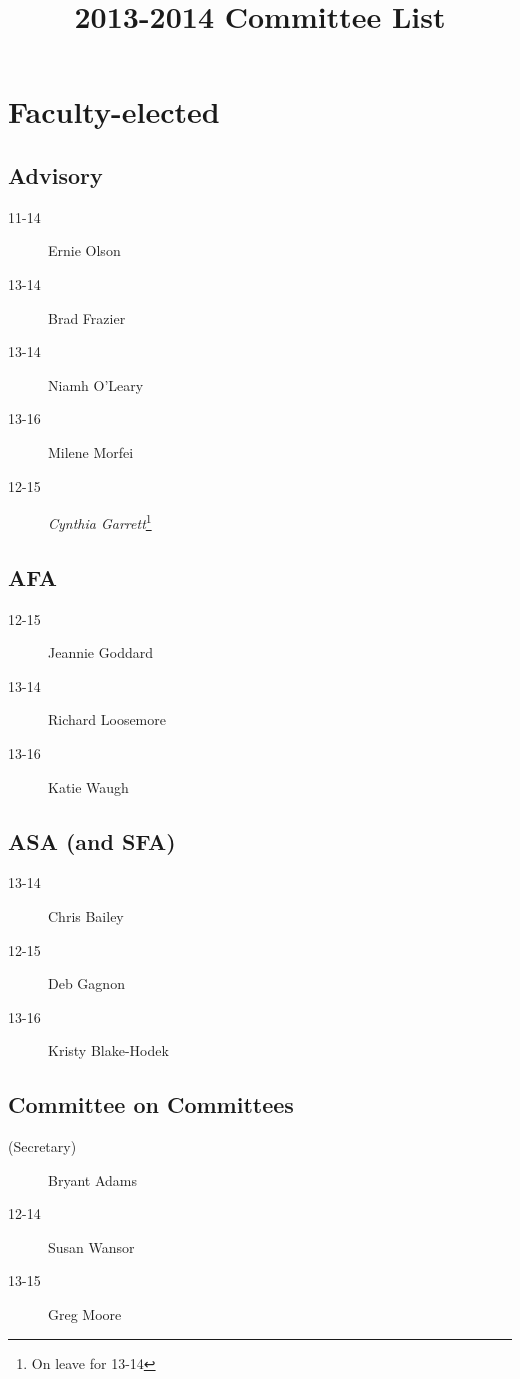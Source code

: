 \documentclass[10pt, twocolumn]{amsart}
\title{2013-2014 Committee List}
\newcommand{\noteMajor}[1]{}
\newcommand{\tempAbsent}[2]{\textit{#1}\footnote{On leave for #2}}
\begin{document}
\maketitle

\section*{Faculty-elected}
\subsection*{Advisory}
\begin{description}
\item[11-14] Ernie Olson \noteMajor{Anthropology and Religion}
\item[13-14] Brad Frazier \noteMajor{Philosophy and Religion}
\item[13-14] Niamh O'Leary \noteMajor{Environmental Studies}
\item[13-16] Milene Morfei \noteMajor{Psychology}
\item[12-15] \tempAbsent{Cynthia Garrett}{13-14} \noteMajor{English}
\end{description}

\subsection*{AFA}
\begin{description}
\item[12-15] Jeannie Goddard
\item[13-14] Richard Loosemore
\item[13-16] Katie Waugh
\end{description}

\subsection*{ASA (and SFA)}
\begin{description}
\item[13-14] Chris Bailey
\item[12-15] Deb Gagnon
\item[13-16] Kristy Blake-Hodek
\end{description}

\subsection*{Committee on Committees}
\begin{description}
\item[(Secretary)] Bryant Adams
\item[12-14] Susan Wansor
\item[13-15] Greg Moore
\end{description}
\end{document}
